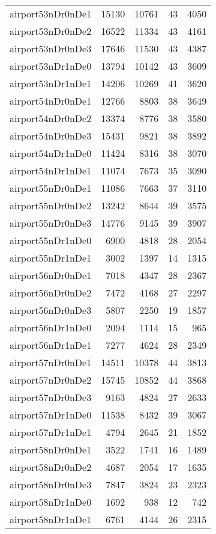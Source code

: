 \begin{longtable}{lrrrr}
airport53nDr0nDe1 & 15130 & 10761 & 43 & 4050 \\
airport53nDr0nDe2 & 16522 & 11334 & 43 & 4161 \\
airport53nDr0nDe3 & 17646 & 11530 & 43 & 4387 \\
airport53nDr1nDe0 & 13794 & 10142 & 43 & 3609 \\
airport53nDr1nDe1 & 14206 & 10269 & 41 & 3620 \\
airport54nDr0nDe1 & 12766 & 8803 & 38 & 3649 \\
airport54nDr0nDe2 & 13374 & 8776 & 38 & 3580 \\
airport54nDr0nDe3 & 15431 & 9821 & 38 & 3892 \\
airport54nDr1nDe0 & 11424 & 8316 & 38 & 3070 \\
airport54nDr1nDe1 & 11074 & 7673 & 35 & 3090 \\
airport55nDr0nDe1 & 11086 & 7663 & 37 & 3110 \\
airport55nDr0nDe2 & 13242 & 8644 & 39 & 3575 \\
airport55nDr0nDe3 & 14776 & 9145 & 39 & 3907 \\
airport55nDr1nDe0 & 6900 & 4818 & 28 & 2054 \\
airport55nDr1nDe1 & 3002 & 1397 & 14 & 1315 \\
airport56nDr0nDe1 & 7018 & 4347 & 28 & 2367 \\
airport56nDr0nDe2 & 7472 & 4168 & 27 & 2297 \\
airport56nDr0nDe3 & 5807 & 2250 & 19 & 1857 \\
airport56nDr1nDe0 & 2094 & 1114 & 15 & 965 \\
airport56nDr1nDe1 & 7277 & 4624 & 28 & 2349 \\
airport57nDr0nDe1 & 14511 & 10378 & 44 & 3813 \\
airport57nDr0nDe2 & 15745 & 10852 & 44 & 3868 \\
airport57nDr0nDe3 & 9163 & 4824 & 27 & 2633 \\
airport57nDr1nDe0 & 11538 & 8432 & 39 & 3067 \\
airport57nDr1nDe1 & 4794 & 2645 & 21 & 1852 \\
airport58nDr0nDe1 & 3522 & 1741 & 16 & 1489 \\
airport58nDr0nDe2 & 4687 & 2054 & 17 & 1635 \\
airport58nDr0nDe3 & 7847 & 3824 & 23 & 2323 \\
airport58nDr1nDe0 & 1692 & 938 & 12 & 742 \\
airport58nDr1nDe1 & 6761 & 4144 & 26 & 2315 \\

\end{longtable}
